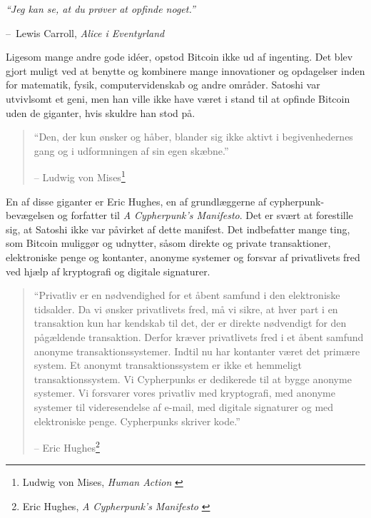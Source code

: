 \documentclass[paper=6in:9in,pagesize=pdftex,headinclude=on,footinclude=on,12pt]{scrbook}
\makeatletter
\newenvironment{chapquote}[2][4em]{\setlength{\@tempdima}{#1}%
   \def\chapquote@author{#2}%
   \parshape 1 \@tempdima \dimexpr\textwidth-2\@tempdima\relax%
   \itshape}{\par\normalfont\hfill--\ \chapquote@author\hspace*{\@tempdima}\par\bigskip}
\makeatother
\begin{document}
\begin{chapquote}{Lewis Carroll, \textit{Alice i Eventyrland}} \enquote{Jeg kan se, at du prøver at opfinde noget.} \end{chapquote}

Ligesom mange andre gode id\'eer, opstod Bitcoin ikke ud af ingenting. Det blev gjort muligt ved at benytte og kombinere mange innovationer og opdagelser inden for matematik, fysik, computervidenskab og andre områder. Satoshi var utvivlsomt et geni, men han ville ikke have været i stand til at opfinde Bitcoin uden de giganter, hvis skuldre han stod på.\begin{quotation}\begin{samepage} \enquote{Den, der kun ønsker og håber, blander sig ikke aktivt i begivenhedernes gang og i udformningen af sin egen skæbne.} \begin{flushright} -- Ludwig von Mises\footnote{Ludwig von Mises, \textit{Human Action} \cite{human-action}}
\end{flushright}\end{samepage}\end{quotation}%

En af disse giganter er Eric Hughes, en af grundlæggerne af cypherpunk-bevægelsen og forfatter til \textit{A Cypherpunk's Manifesto}. Det er svært at forestille sig, at Satoshi ikke var påvirket af dette manifest. Det indbefatter mange ting, som Bitcoin muliggør og udnytter, såsom direkte og private transaktioner, elektroniske penge og kontanter, anonyme systemer og forsvar af privatlivets fred ved hjælp af kryptografi og digitale signaturer.\begin{quotation}\begin{samepage} \enquote{Privatliv er en nødvendighed for et åbent samfund i den elektroniske tidsalder. \href{...}{} Da vi ønsker privatlivets fred, må vi sikre, at hver part i en transaktion kun har kendskab til det, der er direkte nødvendigt for den pågældende transaktion. \href{...}{} Derfor kræver privatlivets fred i et åbent samfund anonyme transaktionssystemer. Indtil nu har kontanter været det primære system. Et anonymt transaktionssystem er ikke et hemmeligt transaktionssystem. \href{...}{} Vi Cypherpunks er dedikerede til at bygge anonyme systemer. Vi forsvarer vores privatliv med kryptografi, med anonyme systemer til videresendelse af e-mail, med digitale signaturer og med elektroniske penge. Cypherpunks skriver kode.} \begin{flushright} -- Eric Hughes\footnote{Eric Hughes, \textit{A Cypherpunk's Manifesto} \cite{cypherpunk-manifesto}}
\end{flushright}\end{samepage}\end{quotation}
\end{document}
